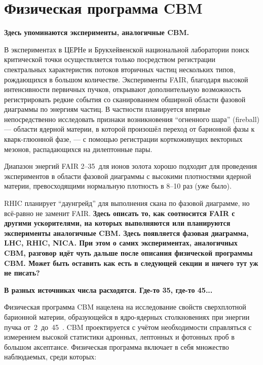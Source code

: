 \section{Физическая программа CBM}

\todo \textbf{Здесь упоминаются эксперименты, аналогичные CBM.}

В экспериментах в ЦЕРНе и Брукхейвенской национальной лаборатории поиск критической точки осуществляется только посредством регистрации спектральных характеристик потоков вторичных частиц нескольких типов, рождающихся в большом количестве. Эксперименты FAIR, благодаря высокой интенсивности первичных пучков, открывают дополнительную возможность регистрировать редкие события со сканированием обширной области фазовой диаграммы по энергиям частиц. В частности планируется впервые непосредственно исследовать признаки возникновения ``огненного шара'' (fireball) --- области ядерной материи, в которой произошёл переход от барионной фазы к кварк-глюонной фазе, --- с помощью регистрации корткоживущих векторных мезонов, распадающихся на дилептонные пары.

Диапазон энергий FAIR 2--35~\GeVperNucl для ионов золота хорошо подходит для проведения экспериментов в области фазовой диаграммы с высокими плотностями ядерной материи, превосходящими нормальную плотность в 8--10 раз (уже было).



RHIC планирует ``даунгрейд'' для выполнения скана по фазовой диаграмме, но \todo всё-равно не заменит FAIR.
\todo \textbf{Здесь описать то, как соотносится FAIR с другими ускорителями, на которых выполняются или планируются эксперименты аналогичные CBM. Здесь появляется фазовая диаграмма, LHC, RHIC, NICA. При этом о самих экспериментах, аналогичных CBM, разговор идёт чуть дальше после описания физической программы CBM. Может быть оставить как есть в следующей секции и ничего тут уж не писать?}


\todo \textbf{В разных источниках числа расходятся. Где-то 35, где-то 45...}

Физическая программа CBM нацелена на исследование свойств сверхплотной барионной материи, образующейся в ядро-ядерных столкновениях при энергии пучка от~2~до~45~\GeVperNucl. CBM проектируется с учётом необходимости справляться с измерением высокой статистики адронных, лептонных и фотонных проб в большом аксептансе. Физическая программа включает в себя множество наблюдаемых, среди которых:

